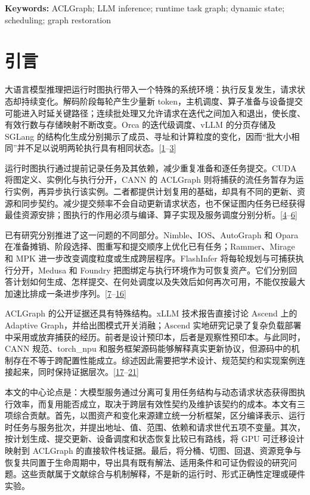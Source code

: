 \documentclass[
  UTF8,
  zihao=5]{ctexart}
\begin{document}
\textbf{Keywords:} ACLGraph; LLM inference; runtime task graph; dynamic
state; scheduling; graph restoration

\hypertarget{ux5f15ux8a00}{%
\section{引言}\label{ux5f15ux8a00}}

大语言模型推理把运行时图执行带入一个特殊的系统环境：执行反复发生，请求状态却持续变化。解码阶段每轮产生少量新
token，主机调度、算子准备与设备提交可能进入时延关键路径；连续批处理又允许请求在迭代之间加入和退出，使长度、有效行数与存储映射不断改变。Orca
的迭代级调度、vLLM 的分页存储及 SGLang
的结构化生成分别揭示了成员、寻址和计算粒度的变化，因而``批大小相同''并不足以说明两轮执行具有相同状态。{[}\protect\hyperlink{ref-yu2022orca}{1}--\protect\hyperlink{ref-zheng2024sglang}{3}{]}

运行时图执行通过提前记录任务及其依赖，减少重复准备和逐任务提交。CUDA
将图定义、实例化与执行分开，CANN 的 ACLGraph
则将捕获的流任务暂存为运行实例，再异步执行该实例。二者都提供计划复用的基础，却具有不同的更新、资源和同步契约。减少提交频率不会自动更新请求状态，也不保证图内任务已经获得最佳资源安排；图执行的作用必须与编译、算子实现及服务调度分别分析。{[}\protect\hyperlink{ref-nvidia2025cudaguide}{4}--\protect\hyperlink{ref-cann910update}{6}{]}

已有研究分别推进了这一问题的不同部分。Nimble、IOS、AutoGraph 和 Opara
在准备摊销、阶段选择、图重写和提交顺序上优化已有任务；Rammer、Mirage 和
MPK 进一步改变调度粒度或生成跨层程序。FlashInfer
将每轮规划与可捕获执行分开，Medusa 和 Foundry
把图绑定与执行环境作为可恢复资产。它们分别回答计划如何生成、怎样提交、在何处调度以及失效后如何再次可用，不能仅按最大加速比排成一条进步序列。{[}\protect\hyperlink{ref-kwon2020nimble}{7}--\protect\hyperlink{ref-liu2026foundry}{16}{]}

ACLGraph 的公开证据还具有特殊结构。xLLM 技术报告直接讨论 Ascend 上的
Adaptive Graph，并给出图模式开关消融；Ascend
实地研究记录了复杂负载部署中采用或放弃捕获的经历。前者是设计预印本，后者是观察性预印本。与此同时，CANN
规范、torch\_npu
和服务框架源码能够解释真实更新协议，但源码中的机制存在不等于跨配置性能成立。综述因此需要把学术设计、规范契约和实现案例连接起来，同时保持证据层次。{[}\protect\hyperlink{ref-liu2025xllm}{17}--\protect\hyperlink{ref-sglang2026impl}{21}{]}

本文的中心论点是：大模型服务通过分离可复用任务结构与动态请求状态获得图执行效率，而复用能否成立，取决于跨层有效性契约及维护该契约的成本。本文有三项综合贡献。首先，以图资产和变化来源建立统一分析框架，区分编译表示、运行时任务与服务批次，并提出地址、值、范围、依赖和请求世代五项不变量。其次，按计划生成、提交更新、设备调度和状态恢复比较已有路线，将
GPU 可迁移设计映射到 ACLGraph
的直接软件栈证据。最后，将分桶、切图、回退、资源竞争与恢复共同置于生命周期中，导出具有既有解法、适用条件和可证伪假设的研究问题。这些贡献属于文献综合与机制解释，不是新的运行时、形式正确性定理或硬件实验。
\end{document}
